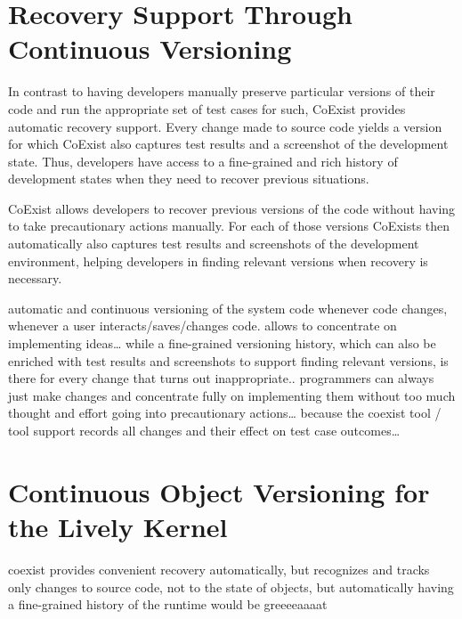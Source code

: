 \section{Recovery Support Through Continuous Versioning}

In contrast to having developers manually preserve particular versions of their code and run the appropriate set of test cases for such, CoExist provides automatic recovery support.
Every change made to source code yields a version for which CoExist also captures test results and a screenshot of the development state.
Thus, developers have access to a fine-grained and rich history of development states when they need to recover previous situations.

CoExist allows developers to recover previous versions of the code without having to take precautionary actions manually.
For each of those versions CoExists then automatically also captures test results and screenshots of the development environment, helping developers in finding relevant versions when recovery is necessary.


automatic and continuous versioning of the system code whenever code changes, whenever a user interacts/saves/changes code.
allows to concentrate on implementing ideas… while a fine-grained versioning history, which can also be enriched with test results and screenshots to support finding relevant versions, is there for every change that turns out inappropriate.. programmers can always just make changes and concentrate fully on implementing them without too much thought and effort going into precautionary actions… because the coexist tool / tool support records all changes and their effect on test case outcomes… 



\section{Continuous Object Versioning for the Lively Kernel}

coexist provides convenient recovery automatically, but recognizes and tracks only changes to source code, not to the state of objects, but automatically having a fine-grained history of the runtime would be greeeeaaaat 

